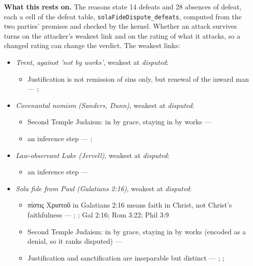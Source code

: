 \documentclass[11pt]{article}
\begin{document}
\par\noindent\textbf{What this rests on.} The reasons state 14 defeats and 28 absences of defeat, each a cell of the defeat table, \texttt{sola\allowbreak{}Fide\allowbreak{}Dispute\_\allowbreak{}defeats}, computed from the two parties' premises and checked by the kernel. Whether an attack survives turns on the attacker's weakest link and on the rating of what it attacks, so a changed rating can change the verdict. The weakest links:
\begin{itemize}
\item \emph{Trent, against 'not by works'}, weakest at \emph{disputed}:
\begin{itemize}
\item Justification is not remission of sins only, but renewal of the inward man --- \cite[Trent, Session VI (1547), Decree on Justification, ch. 7]{tanner-decrees-1990}; \cite[Trent, Session VI (1547), canon 11]{tanner-decrees-1990}
\end{itemize}
\item \emph{Covenantal nomism (Sanders, Dunn)}, weakest at \emph{disputed}:
\begin{itemize}
\item Second Temple Judaism: in by grace, staying in by works --- \cite{sanders-paul-palestinian-judaism-1977}
\item an inference step --- \cite{dunn-new-perspective-2005}; \cite{wright-what-paul-said-1997}
\end{itemize}
\item \emph{Law-observant Luke (Jervell)}, weakest at \emph{disputed}:
\begin{itemize}
\item an inference step --- \cite{jervell-luke-people-god-1972}
\end{itemize}
\item \emph{Sola fide from Paul (Galatians 2:16)}, weakest at \emph{disputed}:
\begin{itemize}
\item πίστις Χριστοῦ in Galatians 2:16 means faith in Christ, not Christ's faithfulness --- \cite{dunn-once-more-pistis-christou-1991}; \cite{matlock-detheologizing-2000}; Gal 2:16; Rom 3:22; Phil 3:9
\item Second Temple Judaism: in by grace, staying in by works (encoded as a denial, so it ranks disputed) --- \cite{sanders-paul-palestinian-judaism-1977}
\item Justification and sanctification are inseparable but distinct --- \cite[XIII.1]{westminster-confession-1647}; \cite[XI.1]{westminster-confession-1647}; \cite[III.xi.6]{calvin-institutes-1960}

\end{itemize}
\end{itemize}
\end{document}
